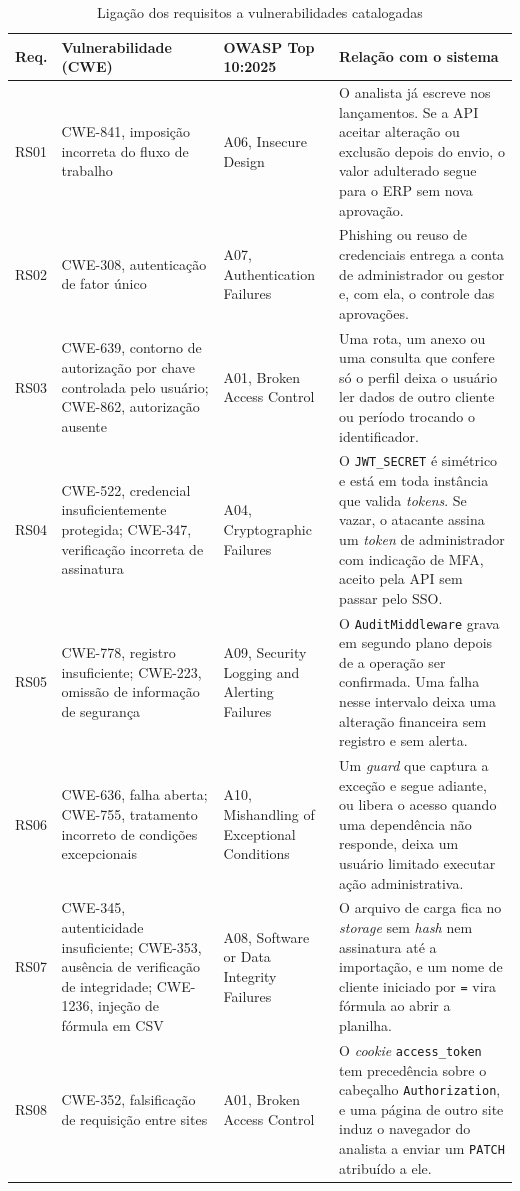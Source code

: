 \documentclass[conference]{IEEEtran}
\begin{document}
\begin{table}[!t]
\centering
\caption{Ligação dos requisitos a vulnerabilidades catalogadas}
\label{tab:vulnerabilidades}
\footnotesize
\renewcommand{\arraystretch}{1.15}
\begin{tabularx}{\textwidth}{@{}l >{\raggedright\arraybackslash}p{4.3cm} >{\raggedright\arraybackslash}p{2.9cm} Y@{}}
\hline
\textbf{Req.} & \textbf{Vulnerabilidade (CWE)} & \textbf{OWASP Top 10:2025} & \textbf{Relação com o sistema} \\
\hline
RS01 & CWE-841, imposição incorreta do fluxo de trabalho & A06, Insecure Design &
O analista já escreve nos lançamentos. Se a API aceitar alteração ou exclusão depois do envio, o valor adulterado segue para o ERP sem nova aprovação. \\
RS02 & CWE-308, autenticação de fator único & A07, Authentication Failures &
Phishing ou reuso de credenciais entrega a conta de administrador ou gestor e, com ela, o controle das aprovações. \\
RS03 & CWE-639, contorno de autorização por chave controlada pelo usuário; CWE-862, autorização ausente & A01, Broken Access Control &
Uma rota, um anexo ou uma consulta que confere só o perfil deixa o usuário ler dados de outro cliente ou período trocando o identificador. \\
RS04 & CWE-522, credencial insuficientemente protegida; CWE-347, verificação incorreta de assinatura & A04, Cryptographic Failures &
O \texttt{JWT\_SECRET} é simétrico e está em toda instância que valida \textit{tokens}. Se vazar, o atacante assina um \textit{token} de administrador com indicação de MFA, aceito pela API sem passar pelo SSO. \\
RS05 & CWE-778, registro insuficiente; CWE-223, omissão de informação de segurança & A09, Security Logging and Alerting Failures &
O \texttt{AuditMiddleware} grava em segundo plano depois de a operação ser confirmada. Uma falha nesse intervalo deixa uma alteração financeira sem registro e sem alerta. \\
RS06 & CWE-636, falha aberta; CWE-755, tratamento incorreto de condições excepcionais & A10, Mishandling of Exceptional Conditions &
Um \textit{guard} que captura a exceção e segue adiante, ou libera o acesso quando uma dependência não responde, deixa um usuário limitado executar ação administrativa. \\
RS07 & CWE-345, autenticidade insuficiente; CWE-353, ausência de verificação de integridade; CWE-1236, injeção de fórmula em CSV & A08, Software or Data Integrity Failures &
O arquivo de carga fica no \textit{storage} sem \textit{hash} nem assinatura até a importação, e um nome de cliente iniciado por \texttt{=} vira fórmula ao abrir a planilha. \\
RS08 & CWE-352, falsificação de requisição entre sites & A01, Broken Access Control &
O \textit{cookie} \texttt{access\_token} tem precedência sobre o cabeçalho \texttt{Authorization}, e uma página de outro site induz o navegador do analista a enviar um \texttt{PATCH} atribuído a ele. \\
\hline
\end{tabularx}
\end{table}
\end{document}
